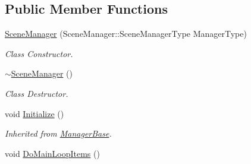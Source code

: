 \subsection*{Public Member Functions}
\begin{DoxyCompactItemize}
\item 
\hyperlink{classphys_1_1SceneManager_a6a6a5b747704d3f4bb724f1b893e2695}{SceneManager} (SceneManager::SceneManagerType ManagerType)
\begin{DoxyCompactList}\small\item\em Class Constructor. \item\end{DoxyCompactList}\item 
\hyperlink{classphys_1_1SceneManager_a5076643eec92dc0c9c9ccb7ac2225cde}{$\sim$SceneManager} ()
\begin{DoxyCompactList}\small\item\em Class Destructor. \item\end{DoxyCompactList}\item 
\hypertarget{classphys_1_1SceneManager_aa13b380a4e38f706a1977237fc4b165e}{
void \hyperlink{classphys_1_1SceneManager_aa13b380a4e38f706a1977237fc4b165e}{Initialize} ()}
\label{dd/da8/classphys_1_1SceneManager_aa13b380a4e38f706a1977237fc4b165e}

\begin{DoxyCompactList}\small\item\em Inherited from \hyperlink{classphys_1_1ManagerBase}{ManagerBase}. \item\end{DoxyCompactList}\item 
\hypertarget{classphys_1_1SceneManager_a27a3f6b21e15f628642b1cad524f1a18}{
void \hyperlink{classphys_1_1SceneManager_a27a3f6b21e15f628642b1cad524f1a18}{DoMainLoopItems} ()}
\label{dd/da8/classphys_1_1SceneManager_a27a3f6b21e15f628642b1cad524f1a18}


\end{DoxyCompactItemize}
